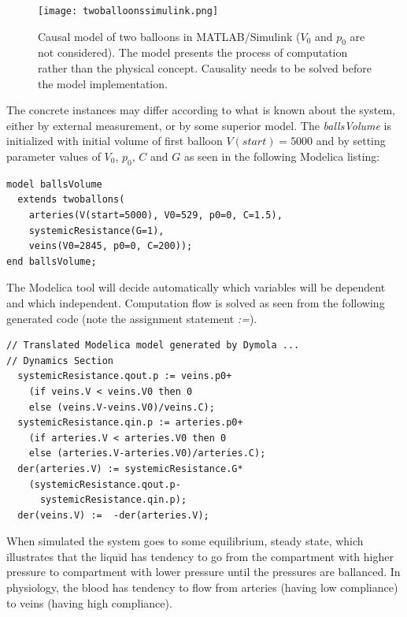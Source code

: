 \documentclass[letterpaper, 10 pt, conference]{ieeeconf}  %
\begin{document}
\begin{figure}[h!]
    \centering
    \texttt{[image: twoballoonssimulink.png]}
    \caption{Causal model of two balloons in MATLAB/Simulink ($V_0$ and $p_0$ are not considered). The model presents the process of computation rather than the physical concept. Causality needs to be solved before the model implementation.}
    \label{fig:twoballonssimulink}
\end{figure}

The concrete instances may differ according to what is known about the system, either by external measurement, or by some superior model. The \emph{ballsVolume} is initialized with initial volume of first balloon $V(start) = 5000$ and by setting parameter values of $V_0$, $p_0$, $C$ and $G$ as seen in the following Modelica listing:

\begin{lstlisting}[language=modelica]
model ballsVolume
  extends twoballons(
    arteries(V(start=5000), V0=529, p0=0, C=1.5),
    systemicResistance(G=1),
    veins(V0=2845, p0=0, C=200));
end ballsVolume;
\end{lstlisting}

The Modelica tool will decide automatically which variables will be dependent and which independent. Computation flow is solved as seen from the following generated code (note the assignment statement \emph{:=}).
\begin{lstlisting}[language=modelica]
// Translated Modelica model generated by Dymola ...
// Dynamics Section
  systemicResistance.qout.p := veins.p0+
    (if veins.V < veins.V0 then 0 
    else (veins.V-veins.V0)/veins.C);
  systemicResistance.qin.p := arteries.p0+
    (if arteries.V < arteries.V0 then 0
    else (arteries.V-arteries.V0)/arteries.C);
  der(arteries.V) := systemicResistance.G*
    (systemicResistance.qout.p-
      systemicResistance.qin.p);
  der(veins.V) :=  -der(arteries.V);
\end{lstlisting}

When simulated the system goes to some equilibrium, steady state, which illustrates  that the liquid has tendency to go from the compartment with higher pressure to compartment with lower pressure until the pressures are ballanced. In physiology, the blood has tendency to flow from arteries (having low compliance) to veins (having high compliance).

\end{document}
